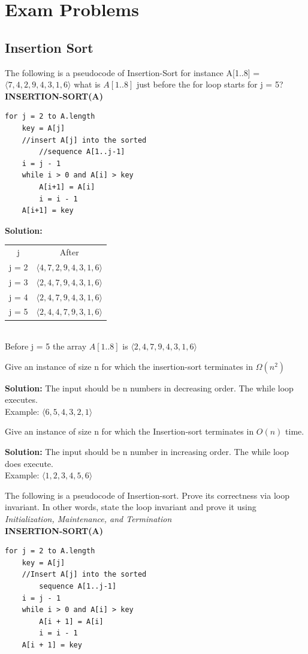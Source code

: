 \documentclass[11pt,fleqn]{book}
\begin{document}
\section{Exam Problems} 
\subsection{Insertion Sort}
\begin{example}
The following is a pseudocode of Insertion-Sort for instance A[1..8] = $\langle 7,4,2,9,4,3,1,6\rangle$ what is $A[1..8]$ just before the for loop starts for j = 5?
\vspace{1em}
\\
\textbf{INSERTION-SORT(A)}
\begin{lstlisting}
for j = 2 to A.length
    key = A[j]
    //insert A[j] into the sorted 
        //sequence A[1..j-1]
    i = j - 1
    while i > 0 and A[i] > key
        A[i+1] = A[i]
        i = i - 1
    A[i+1] = key
\end{lstlisting}
\end{example}
\textbf{Solution:}
\vspace{1em}
\begin{tabular}{c|c}
    j & After \\
    j = 2 & $\langle 4,7,2,9,4,3,1,6 \rangle$ \\
    j = 3 & $\langle 2,4,7,9,4,3,1,6 \rangle$ \\
    j = 4 & $\langle 2,4,7,9,4,3,1,6\rangle$ \\
    j = 5 & $\langle 2,4,4,7,9,3,1,6 \rangle$ \\
\end{tabular}
\\
Before j = 5 the array $A[1..8]$ is $\langle 2,4,7,9,4,3,1,6\rangle$
\begin{example}
Give an instance of size n for which the insertion-sort terminates in $\Omega(n^2)$
\end{example}
\textbf{Solution:} The input should be n numbers in decreasing order. The while loop executes.  \\
Example: $\langle 6,5,4,3,2,1 \rangle$
\begin{example}
Give an instance of size n for which the Insertion-sort terminates in $O(n)$ time.
\end{example}
\textbf{Solution:} The input should be n number in increasing order. The while loop does execute.\\
Example: $\langle 1,2,3,4,5,6 \rangle$
\begin{example}
The following is a pseudocode of Insertion-sort. Prove its correctness via loop invariant. In other words, state the loop invariant and prove it using \textit{Initialization, Maintenance, and Termination}\\
\textbf{INSERTION-SORT(A)}
\begin{lstlisting}
for j = 2 to A.length 
    key = A[j]
    //Insert A[j] into the sorted 
        sequence A[1..j-1]
    i = j - 1
    while i > 0 and A[i] > key
        A[i + 1] = A[i]
        i = i - 1
    A[i + 1] = key 
\end{lstlisting}
\end{example}
\end{document}
